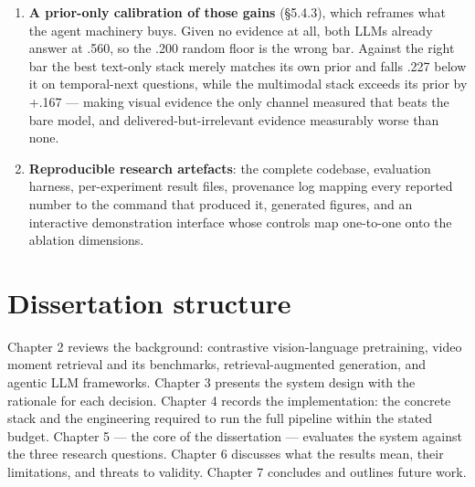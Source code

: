 \begin{enumerate}
  anchors events by search, walks the timeline around them, and audits
  its own draft citations against gathered evidence, improving five-way
  QA accuracy from .447 to .547 over a single-loop agent. A controlled
  evidence-channel experiment, holding tools, prompts and retrieval
  fixed, then shows that supplying keyframes to the answering model
  nearly doubles accuracy on \emph{what-happened-next} questions (.341
  \ensuremath{\rightarrow} .636). Modality therefore matters
  independently at both ends of the pipeline.
\item
  \textbf{A prior-only calibration of those gains} (§5.4.3), which
  reframes what the agent machinery buys. Given no evidence at all, both
  LLMs already answer at .560, so the .200 random floor is the wrong
  bar. Against the right bar the best text-only stack merely matches its
  own prior and falls .227 below it on temporal-next questions, while
  the multimodal stack exceeds its prior by +.167 --- making visual
  evidence the only channel measured that beats the bare model, and
  delivered-but-irrelevant evidence measurably worse than none.
\item
  \textbf{Reproducible research artefacts}: the complete codebase,
  evaluation harness, per-experiment result files, provenance log
  mapping every reported number to the command that produced it,
  generated figures, and an interactive demonstration interface whose
  controls map one-to-one onto the ablation dimensions.
\end{enumerate}

\section{Dissertation structure}

Chapter 2 reviews the background: contrastive vision-language
pretraining, video moment retrieval and its benchmarks,
retrieval-augmented generation, and agentic LLM frameworks. Chapter 3
presents the system design with the rationale for each decision. Chapter
4 records the implementation: the concrete stack and the engineering
required to run the full pipeline within the stated budget. Chapter 5
--- the core of the dissertation --- evaluates the system against the
three research questions. Chapter 6 discusses what the results mean,
their limitations, and threats to validity. Chapter 7 concludes and
outlines future work.
